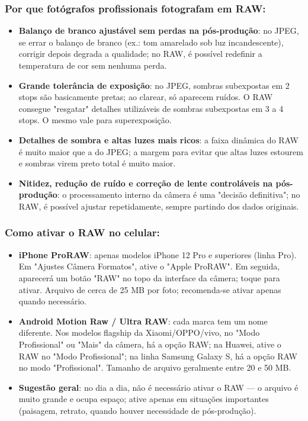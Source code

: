 \subsubsection*{Por que fotógrafos profissionais fotografam em RAW:}

\begin{itemize}
  \item \textbf{Balanço de branco ajustável sem perdas na pós-produção}: no JPEG, se errar o balanço de branco (ex.: tom amarelado sob luz incandescente), corrigir depois degrada a qualidade; no RAW, é possível redefinir a temperatura de cor sem nenhuma perda.
  \item \textbf{Grande tolerância de exposição}: no JPEG, sombras subexpostas em 2 stops são basicamente pretas; ao clarear, só aparecem ruídos. O RAW consegue "resgatar" detalhes utilizáveis de sombras subexpostas em 3 a 4 stops. O mesmo vale para superexposição.
  \item \textbf{Detalhes de sombra e altas luzes mais ricos}: a faixa dinâmica do RAW é muito maior que a do JPEG; a margem para evitar que altas luzes estourem e sombras virem preto total é muito maior.
  \item \textbf{Nitidez, redução de ruído e correção de lente controláveis na pós-produção}: o processamento interno da câmera é uma "decisão definitiva"; no RAW, é possível ajustar repetidamente, sempre partindo dos dados originais.
\end{itemize}

\subsubsection*{Como ativar o RAW no celular:}

\begin{itemize}
  \item \textbf{iPhone ProRAW}: apenas modelos iPhone 12 Pro e superiores (linha Pro). Em "Ajustes Câmera Formatos", ative o "Apple ProRAW". Em seguida, aparecerá um botão "RAW" no topo da interface da câmera; toque para ativar. Arquivo de cerca de 25 MB por foto; recomenda-se ativar apenas quando necessário.
  \item \textbf{Android Motion Raw / Ultra RAW}: cada marca tem um nome diferente. Nos modelos flagship da Xiaomi/OPPO/vivo, no "Modo Profissional" ou "Mais" da câmera, há a opção RAW; na Huawei, ative o RAW no "Modo Profissional"; na linha Samsung Galaxy S, há a opção RAW no modo "Profissional". Tamanho de arquivo geralmente entre 20 e 50 MB.
  \item \textbf{Sugestão geral}: no dia a dia, não é necessário ativar o RAW — o arquivo é muito grande e ocupa espaço; ative apenas em situações importantes (paisagem, retrato, quando houver necessidade de pós-produção).
\end{itemize}


